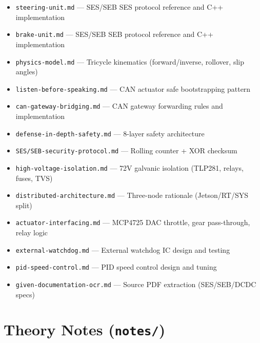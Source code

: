 \documentclass[12pt,a4paper,oneside]{report}
\begin{document}
\begin{itemize}[leftmargin=*,nosep]
  \item \texttt{steering-unit.md} --- SES/SEB SES protocol reference and C++ implementation
  \item \texttt{brake-unit.md} --- SES/SEB SEB protocol reference and C++ implementation
  \item \texttt{physics-model.md} --- Tricycle kinematics (forward/inverse, rollover, slip angles)
  \item \texttt{listen-before-speaking.md} --- CAN actuator safe bootstrapping pattern
  \item \texttt{can-gateway-bridging.md} --- CAN gateway forwarding rules and implementation
  \item \texttt{defense-in-depth-safety.md} --- 8-layer safety architecture
  \item \texttt{SES/SEB-security-protocol.md} --- Rolling counter + XOR checksum
  \item \texttt{high-voltage-isolation.md} --- 72V galvanic isolation (TLP281, relays, fuses, TVS)
  \item \texttt{distributed-architecture.md} --- Three-node rationale (Jetson/RT/SYS split)
  \item \texttt{actuator-interfacing.md} --- MCP4725 DAC throttle, gear pass-through, relay logic
  \item \texttt{external-watchdog.md} --- External watchdog IC design and testing
  \item \texttt{pid-speed-control.md} --- PID speed control design and tuning
  \item \texttt{given-documentation-ocr.md} --- Source PDF extraction (SES/SEB/DCDC specs)
\end{itemize}

\section{Theory Notes (\texttt{notes/})}
\end{document}

